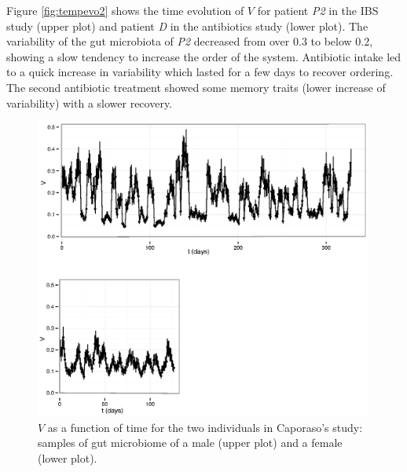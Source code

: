 Figure \ref{fig:tempevo2} shows the time evolution of $V$ for patient \emph{P2} in the IBS study\cite{IBS} (upper plot) and patient \emph{D} in the antibiotics study\cite{antibiotic} (lower plot). The variability of the gut microbiota of \emph{P2} decreased from over 0.3 to below 0.2, showing a slow tendency to increase the order of the system.  Antibiotic intake led to a quick increase in variability which lasted for a few days to recover ordering. The second antibiotic treatment showed some memory traits (lower increase of variability) with a slower recovery.

\begin{figure}
	\includegraphics[width=0.99\textwidth]{figs/Fig6.eps}
\caption{$V$ as a function of time for the two individuals in Caporaso's study\cite{moving}: samples of gut microbiome of a male (upper plot) and a female (lower plot).}
\label{fig:tempevo1}
\end{figure}

